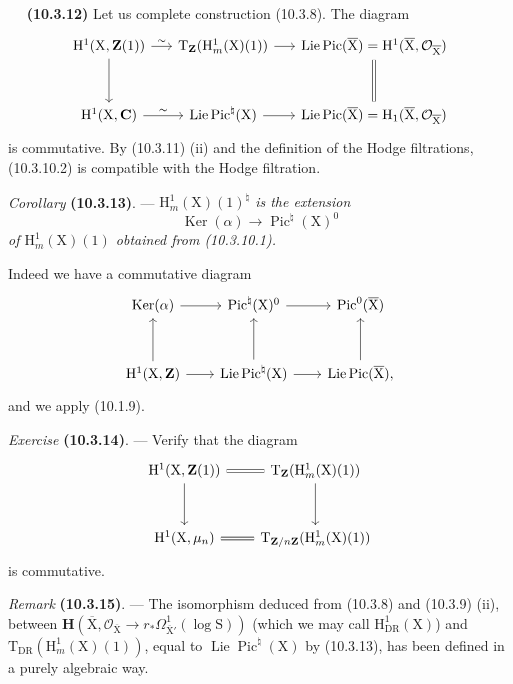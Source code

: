 \documentclass[11pt,leqno]{article}
\newcommand{\Page}[1]{\ifvmode\noindent\else\unskip\ \fi{\footnotesize\textcolor{gray}{[p.\,#1]}}\ \ignorespaces}
\begin{document}
\Page{74}
\textbf{(10.3.12)} Let us complete construction (10.3.8). The diagram
\[
\begin{tikzcd}[column sep=1.5em,row sep=3em]
\mathrm{H}^{1}(\mathrm{X},\mathbf{Z}(1))
 \arrow[r,"\sim"] \arrow[d]
&
\mathrm{T}_{\mathbf{Z}}(\mathrm{H}^{1}_{m}(\mathrm{X})(1))
 \arrow[r]
&
\operatorname{Lie}\operatorname{Pic}(\overline{\mathrm{X}})
 =\mathrm{H}^{1}(\overline{\mathrm{X}},\mathcal{O}_{\overline{\mathrm{X}}})
 \arrow[d,equal]
\\
\mathrm{H}^{1}(\mathrm{X},\mathbf{C})
 \arrow[r,"\sim"]
&
\operatorname{Lie}\operatorname{Pic}^{\natural}(\mathrm{X})
 \arrow[r]
&
\operatorname{Lie}\operatorname{Pic}(\overline{\mathrm{X}})
 =\mathrm{H}_{1}(\overline{\mathrm{X}},\mathcal{O}_{\overline{\mathrm{X}}})
\end{tikzcd}
\]
is commutative. By (10.3.11) (ii) and the definition of the Hodge filtrations, (10.3.10.2) is compatible with the Hodge filtration.

\textit{Corollary} \textbf{(10.3.13)}. — \textit{\(\mathrm{H}^{1}_{m}(\mathrm{X})(1)^{\natural}\) is the extension}
\[
\operatorname{Ker}(\alpha)\longrightarrow\operatorname{Pic}^{\natural}(\mathrm{X})^{0}
\]
\textit{of \(\mathrm{H}^{1}_{m}(\mathrm{X})(1)\) obtained from \textup{(10.3.10.1)}.}

Indeed we have a commutative diagram
\[
\begin{tikzcd}[column sep=2em,row sep=3em]
\operatorname{Ker}(\alpha) \arrow[r]
&
\operatorname{Pic}^{\natural}(\mathrm{X})^{0} \arrow[r]
&
\operatorname{Pic}^{0}(\overline{\mathrm{X}})
\\
\mathrm{H}^{1}(\mathrm{X},\mathbf{Z}) \arrow[r] \arrow[u]
&
\operatorname{Lie}\operatorname{Pic}^{\natural}(\mathrm{X})
 \arrow[r] \arrow[u]
&
\operatorname{Lie}\operatorname{Pic}(\overline{\mathrm{X}}), \arrow[u]
\end{tikzcd}
\]
and we apply (10.1.9).

\textit{Exercise} \textbf{(10.3.14)}. — Verify that the diagram
\[
\begin{tikzcd}[column sep=2em,row sep=3em]
\mathrm{H}^{1}(\mathrm{X},\mathbf{Z}(1))
 \arrow[r,equal] \arrow[d]
&
\mathrm{T}_{\mathbf{Z}}(\mathrm{H}^{1}_{m}(\mathrm{X})(1))
 \arrow[d]
\\
\mathrm{H}^{1}(\mathrm{X},\mu_n) \arrow[r,equal]
&
\mathrm{T}_{\mathbf{Z}/n\mathbf{Z}}(\mathrm{H}^{1}_{m}(\mathrm{X})(1))
\end{tikzcd}
\]
is commutative.

\textit{Remark} \textbf{(10.3.15)}. — The isomorphism deduced from (10.3.8) and (10.3.9) (ii), between \(\mathbf{H}(\overline{\mathrm{X}},\mathcal{O}_{\overline{\mathrm{X}}}\to r_*\Omega^{1}_{\overline{\mathrm{X}}'}(\log\mathrm{S}))\) (which we may call \(\mathrm{H}^{1}_{\mathrm{DR}}(\mathrm{X})\)) and \(\mathrm{T}_{\mathrm{DR}}(\mathrm{H}^{1}_{m}(\mathrm{X})(1))\), equal to \(\operatorname{Lie}\operatorname{Pic}^{\natural}(\mathrm{X})\) by (10.3.13), has been defined in a purely algebraic way.
\end{document}
